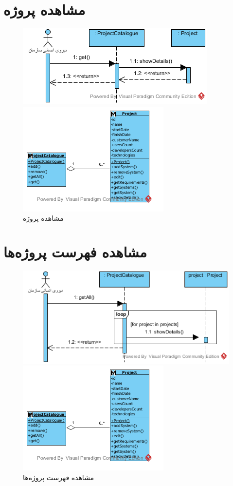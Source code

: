 \section{مشاهده پروژه}
\begin{figure}[H]
	\centering
	\includegraphics[scale=1]{img/sequence-analysis/ViewProject}
	
	
	\includegraphics[scale=1]{img/sequence-analysis/ViewProjectC}
	\caption{مشاهده پروژه}
\end{figure}


\section{مشاهده فهرست پروژه‌ها}
\begin{figure}[H]
	\centering
	\includegraphics[scale=1]{img/sequence-analysis/ViewListOfProjects}
	
	
	\includegraphics[scale=1]{img/sequence-analysis/ViewListOfProjectsC}
	\caption{مشاهده فهرست پروژه‌ها}
\end{figure}


